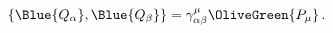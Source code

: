 \begin{equation}
  \left\{ \Blue{Q_\alpha },\Blue{Q_\beta }\right\} =
  \gamma ^\mu _{\alpha \beta }\OliveGreen{P_\mu
  }\,.
 \label{minSUSYalg}
\end{equation}

